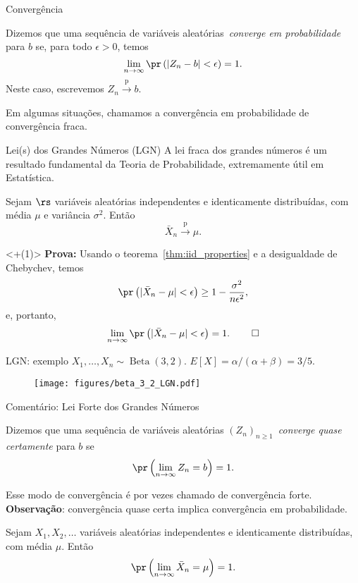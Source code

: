 \begin{frame}{Convergência}
\begin{defn}
\label{defn:weak_convergence}
Dizemos que uma sequência de variáveis aleatórias~\textit{converge em probabilidade} para $b$ se, para todo $\epsilon > 0$, temos
\begin{equation}
 \nonumber
 \lim_{n\to\infty} \pr\left(|Z_n-b| < \epsilon \right) = 1.
\end{equation}
Neste caso, escrevemos $Z_n \xrightarrow{\text{p}} b$.
\end{defn}
Em algumas situações, chamamos a convergência em probabilidade de convergência fraca.
\end{frame}
\begin{frame}{Lei(s) dos Grandes Números (LGN)}
A lei fraca dos grandes números é um resultado fundamental da Teoria de Probabilidade, extremamente útil em Estatística.
\begin{theo}
\label{thm:WLLN}
Sejam  $\rs$ variáveis aleatórias independentes e identicamente distribuídas, com média $\mu$ e variância $\sigma^2$.
 Então
 $$ \bar{X}_n \xrightarrow{\text{p}} \mu.$$
\end{theo}
\uncover<+(1)>{
\textbf{Prova:}
Usando o teorema~\ref{thm:iid_properties} e a desigualdade de Chebychev, temos
$$ \pr\left( |\bar{X}_n - \mu| < \epsilon\right) \geq  1 - \frac{\sigma^2}{n\epsilon^2},$$
e, portanto,
$$ \lim_{n\to\infty} \pr\left( |\bar{X}_n - \mu| < \epsilon\right) = 1. \: \qed$$
}
\end{frame}
\begin{frame}{LGN: exemplo}
$X_1, \ldots, X_n \sim \operatorname{Beta}(3, 2)$.
$E[X] = \alpha / (\alpha + \beta) = 3/5$.
\begin{figure}[!ht]
\label{fig:beta_LGN}
\begin{center}
\texttt{[image: figures/beta\_3\_2\_LGN.pdf]} 
\end{center} 
\end{figure} 
\end{frame}
\begin{frame}{Comentário: Lei Forte dos Grandes Números}
\begin{defn}
 \label{dfn:as_convergence}
Dizemos que uma sequência de variáveis aleatórias $\left(Z_n\right)_{n\geq 1}$~\textit{converge quase certamente} para $b$ se
$$\pr\left(\lim_{n\to \infty} Z_n = b\right) = 1.$$
\end{defn}
Esse modo de convergência é por vezes chamado de convergência forte.
\textbf{Observação}: convergência quase certa implica convergência em probabilidade.
 \begin{theo}
  \label{thm:SLLN}
   Sejam  $X_1, X_2, \ldots $ variáveis aleatórias independentes e identicamente distribuídas, com média $\mu$.
 Então
 $$\pr\left(\lim_{n\to \infty} \bar{X}_n = \mu \right) = 1.$$
 \end{theo}
\end{frame}
